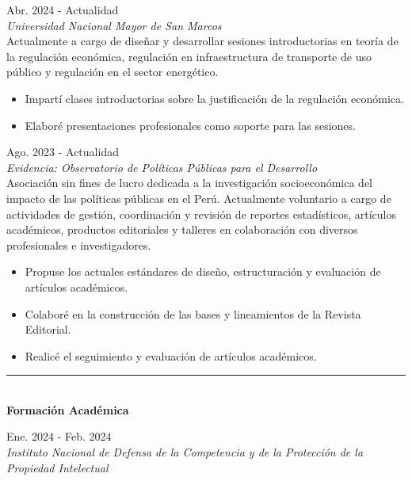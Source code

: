 \documentclass{resume}
\begin{document}
 \hfill {Abr. 2024 - Actualidad} \\
{\it Universidad Nacional Mayor de San Marcos} \vspace{5pt} \\
\noindent Actualmente a cargo de diseñar y desarrollar sesiones introductorias en teoría de la regulación económica,
regulación en infraestructura de transporte de uso público y regulación en el sector energético.
\begin{itemize}[noitemsep,topsep=5pt]
	\item Impartí clases introductorias sobre la justificación de la regulación económica.
	\item Elaboré presentaciones profesionales como soporte para las sesiones.
\end{itemize}

 \hfill {Ago. 2023 - Actualidad} \\
{\it Evidencia: Observatorio de Políticas Públicas para el Desarrollo} \vspace{5pt} \\
\noindent Asociación sin fines de lucro dedicada a la investigación socioeconómica del impacto de las políticas públicas en el Perú.
Actualmente voluntario a cargo de actividades de gestión, coordinación y revisión de reportes estadísticos,
artículos académicos, productos editoriales y talleres en colaboración con diversos profesionales e investigadores. %
\begin{itemize}[noitemsep,topsep=5pt]
	\item Propuse los actuales estándares de diseño, estructuración y evaluación de artículos académicos.
	\item Colaboré en la construcción de las bases y lineamientos de la Revista Editorial.
	\item Realicé el seguimiento y evaluación de artículos académicos.
\end{itemize}


{\color{vino} \noindent \rule{\textwidth}{1pt}} \\
{\color{vino} \noindent \faGraduationCap \; {\large \bf Formación Académica}}
\vspace{5pt}

 \hfill {Ene. 2024 - Feb. 2024} \\
{\it Instituto Nacional de Defensa de la Competencia y de la Protección de la Propiedad Intelectual}
\vspace{5pt}
\end{document}
